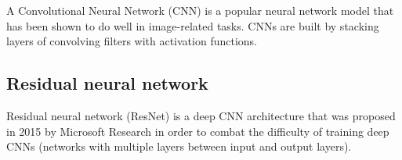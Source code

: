 A Convolutional Neural Network (CNN) is a popular neural network model that has been shown to do well in image-related tasks.
CNNs are built by stacking layers of convolving filters with activation functions.



\subsection{Residual neural network}
Residual neural network (ResNet) is a deep CNN architecture that was proposed in 2015 by Microsoft Research in order to combat the difficulty of training deep CNNs (networks with multiple layers between input and output layers).

